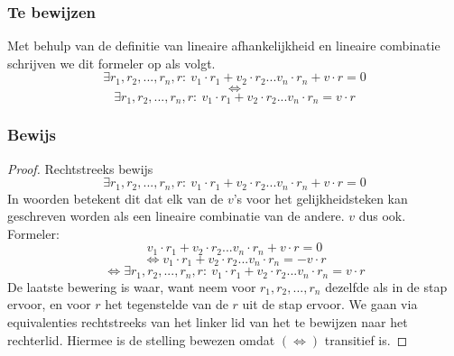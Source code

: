 \documentclass[lineaire_algebra_oplossingen.tex]{subfiles}
\begin{document}
\subsubsection*{Te bewijzen}
Met behulp van de definitie van lineaire afhankelijkheid en lineaire combinatie schrijven we dit formeler op als volgt.
\[
\exists r_1,r_2,...,r_n,r:\ v_1\cdot r_1 + v_2\cdot r_2...v_n \cdot r_n + v \cdot r = 0
\]
\[\Leftrightarrow \]
\[\exists r_1,r_2,...,r_n,r:\ v_1\cdot r_1 + v_2\cdot r_2...v_n \cdot r_n = v \cdot r \]
\subsubsection*{Bewijs}
\begin{proof}
Rechtstreeks bewijs
\[
\exists r_1,r_2,...,r_n,r:\ v_1\cdot r_1 + v_2\cdot r_2...v_n \cdot r_n + v \cdot r = 0
\]
In woorden betekent dit dat elk van de $v$'s voor het gelijkheidsteken kan geschreven worden als een lineaire combinatie van de andere. $v$ dus ook.\\
Formeler:
\[
v_1\cdot r_1 + v_2\cdot r_2...v_n \cdot r_n + v \cdot r = 0
\]
\[
\Leftrightarrow v_1\cdot r_1 + v_2\cdot r_2...v_n \cdot r_n = - v \cdot r 
\]
\[\Leftrightarrow \exists r_1,r_2,...,r_n,r:\ v_1\cdot r_1 + v_2\cdot r_2...v_n \cdot r_n = v \cdot r \]
De laatste bewering is waar, want neem voor $r_1,r_2,...,r_n$ dezelfde als in de stap ervoor, en voor $r$ het tegenstelde van de $r$ uit de stap ervoor.
We gaan via equivalenties rechtstreeks van het linker lid van het te bewijzen naar het rechterlid. Hiermee is de stelling bewezen omdat $(\Leftrightarrow)$ transitief is.
\end{proof}
\end{document}
